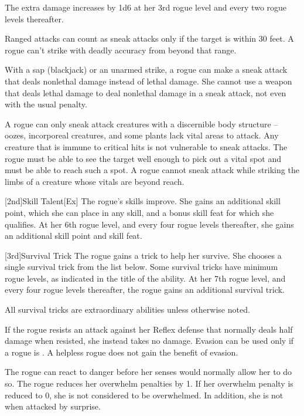 The extra damage increases by 1d6 at her 3rd rogue level and every two rogue levels thereafter.

\par Ranged attacks can count as sneak attacks only if the target is within 30 feet.
A rogue can't strike with deadly accuracy from beyond that range.

With a sap (blackjack) or an unarmed strike, a rogue can make a sneak attack that deals nonlethal damage instead of lethal damage.
She cannot use a weapon that deals lethal damage to deal nonlethal damage in a sneak attack, not even with the usual  penalty.

A rogue can only sneak attack creatures with a discernible body structure -- oozes, incorporeal creatures, and some plants lack vital areas to attack.
Any creature that is immune to critical hits is not vulnerable to sneak attacks.
The rogue must be able to see the target well enough to pick out a vital spot and must be able to reach such a spot.
A rogue cannot sneak attack while striking the limbs of a creature whose vitals are beyond reach.

[2nd]{Skill Talent}[Ex]
The rogue's skills improve.
She gains an additional skill point, which she can place in any skill, and a bonus skill feat for which she qualifies.
At her 6th rogue level, and every four rogue levels thereafter, she gains an additional skill point and skill feat.

[3rd]{Survival Trick}
The rogue gains a trick to help her survive.
She chooses a single survival trick from the list below.
Some survival tricks have minimum rogue levels, as indicated in the title of the ability.
At her 7th rogue level, and every four rogue levels thereafter, the rogue gains an additional survival trick.

All survival tricks are extraordinary abilities unless otherwise noted.

If the rogue resists an attack against her Reflex defense that normally deals half damage when resisted, she instead takes no damage.
Evasion can be used only if a rogue is \unencumbered.
A helpless rogue does not gain the benefit of evasion.

The rogue can react to danger before her senses would normally allow her to do so.
The rogue reduces her overwhelm penalties by 1.
If her overwhelm penalty is reduced to 0, she is not considered to be overwhelmed.
In addition, she is not \unaware when attacked by surprise.

